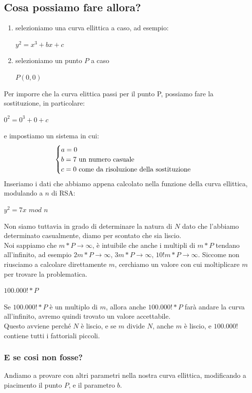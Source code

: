 \documentclass[11pt, oneside]{article}   	%
\begin{document}
\subsection*{Cosa possiamo fare allora?}
\begin{enumerate}
\item selezioniamo una curva ellittica a caso, ad esempio:
\begin{center}
$y^2 = x^3 + bx + c$ 
\end{center}
\item selezioniamo un punto $P$ a caso
\begin{center}
$P(0,0)$
\end{center}
\end{enumerate}
Per imporre che la curva elittica passi per il punto P, possiamo fare la sostituzione, in particolare:
\begin{center}
$0^2 = 0^3 + 0 +c$
\end{center}
e impostiamo un sistema in cui:
\begin{equation}
    \begin{cases}
a = 0\\
b = 7 $ un numero casuale$\\
c = 0 $ come da risoluzione della sostituzione$
\end{cases}
\end{equation}
Inseriamo i dati che abbiamo appena calcolato nella funzione della curva ellittica, modulando a $n$ di RSA:
\begin{center}
$y^2 = 7x$ $mod$ $n$
\end{center}
Non siamo tuttavia in grado di determinare la natura di $N$ dato che l'abbiamo determinato casualmente, diamo per scontato che sia liscio.\\

Noi sappiamo che $m * P \rightarrow \infty$, è intuibile che anche i multipli di $m * P$ tendano all'infinito, ad esempio $2m * P \rightarrow \infty$, $3m * P \rightarrow \infty$, $10!m * P \rightarrow \infty$. Siccome non riusciamo a calcolare direttamente $m$, cerchiamo un valore con cui moltiplicare $m$ per trovare la problematica.\begin{center}
$100.000! * P $
\end{center}
Se $100.000! * P $ è un multiplo di $m$, allora anche $100.000! * P $ farà andare la curva all'infinito, avremo quindi trovato un valore accettabile.\\
Questo avviene perché $N$ è liscio, e se $m$ divide $N$, anche $m$ è liscio, e $100.000!$ contiene tutti i fattoriali piccoli.
\subsubsection*{E se cosi non fosse?}
Andiamo a provare con altri parametri nella nostra curva ellittica, modificando a piacimento il punto $P$, e il parametro $b$.
\end{document}
